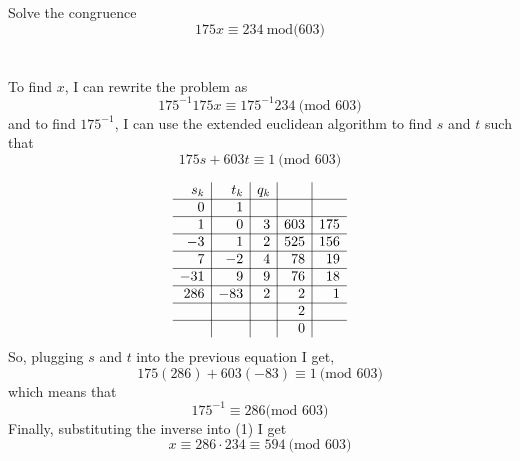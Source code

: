 \documentclass[titlepage]{article}
\newenvironment{problem}[2][Problem]{\begin{trivlist}
\item[\hskip \labelsep {\bfseries #1}\hskip \labelsep {\bfseries #2.}]}{\end{trivlist}}
\begin{document}
\begin{problem}{2}
	Solve the congruence
	$$175x \equiv 234 \ \text{mod(603)}$$
	\\ \\
	To find $x$, I can rewrite the problem as 
	\begin{equation}175^{-1} 175x \equiv 175^{-1} 234 \ \text{(mod 603)} \end{equation}
	and to find $175^{-1}$, I can use the extended euclidean algorithm to find $s$ and $t$ such that
	$$175s + 603t \equiv 1 \ \text{(mod 603)} $$

$$	\begin{array}{r|r|r|r|r}
	s_k&t_k&q_k& & \\\hline
	0&1& & &  \\\hline
	1 & 0 & 3& 603 & 175\\\hline
	-3 & 1 & 2 & 525 & 156 \\\hline
	7 & -2 & 4 & 78 & 19 \\\hline
	-31 & 9 & 9 & 76 & 18 \\\hline
	286 & -83 & 2 & 2 & 1 \\\hline
	&&&2&\\\hline
	&&&0&
	\end{array}$$
	So, plugging $s$ and $t$ into the previous equation I get,
	$$175(286) + 603(-83) \equiv 1 \ \text{(mod 603)}$$
	which means that 
	$$175^{-1} \equiv 286 \text{(mod 603)}$$
	Finally, substituting the inverse into (1) I get
	$$x \equiv 286\cdot 234 \equiv 594 \ \text{(mod 603)}$$
\end{problem}
\end{document}

